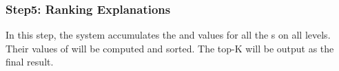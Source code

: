 

\subsubsection{Step5: Ranking Explanations}
\label{sec:extending_hi}
In this step, the system accumulates the {\intensity} and {\influence} values for all the {\explanation}s on all levels. Their values of {\newvalue} will be computed and sorted. The top-K {\explanation} will be output as the final result. 

